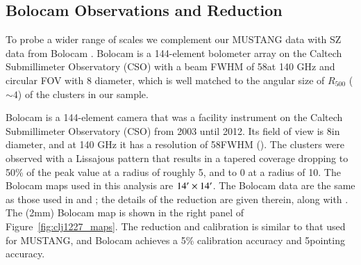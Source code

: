 \documentclass[twocolumn,traditabstract]{aa}
\begin{document}

\subsection{Bolocam Observations and Reduction}
\label{sec:bolocamobs}

To probe a wider range of scales we complement our MUSTANG data with SZ data from Bolocam \citep{glenn1998}. 
Bolocam is a 144-element bolometer
array on the Caltech Submillimeter Observatory (CSO) with a beam FWHM of 58\asecs at 140 GHz and circular FOV with 8\amins 
diameter, which is well matched to the angular size of $R_{500}$ ($\sim 4$\amin) of the clusters in our sample. 

Bolocam is a 144-element camera that was a facility instrument on the Caltech Submillimeter Observatory (CSO) from
2003 until 2012. Its field of view is 8\amins in diameter, and at 140 GHz it has a resolution of 58\asecs FWHM
(\citet{glenn1998,haig2004}). The clusters were observed with a Lissajous pattern that results in a tapered
coverage dropping to 50\% of the peak value at a radius of roughly 5\amin, and to 0 at a radius of 10\amin.
The Bolocam maps used in this analysis are $14\hbox{$^\prime$} \times 14\hbox{$^\prime$}$. The Bolocam data 
are the same as those used in \citet{czakon2015} and \citet{sayers2013}; the details of the reduction are 
given therein, along with \citet{sayers2011}. The (2mm) Bolocam map is shown in the right panel of Figure~\ref{fig:clj1227_maps}.
The reduction and calibration is similar to that used for MUSTANG, and Bolocam achieves a 
5\% calibration accuracy and 5\asecs pointing accuracy.

\end{document}
